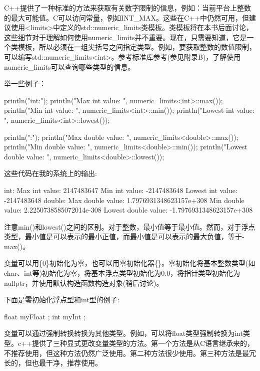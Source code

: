 C++提供了一种标准的方法来获取有关数字限制的信息，例如：当前平台上整数的最大可能值。C可以访问常量，例如INT\_MAX。这些在C++中仍然可用，但建议使用<limits>中定义的std::numeric\_limits类模板。类模板将在本书后面讨论，这些细节对于理解如何使用numeric\_limits并不重要。现在，只需要知道，它是一个类模板，所以必须在一组尖括号之间指定类型。例如，要获取整数的数值限制，可以编写std::numeric\_limits<int>。参考标准库参考(参见附录B)，了解使用numeric\_limits可以查询哪些类型的信息。

举一些例子：

\begin{cpp}
println("int:");
println("Max int value: {}", numeric_limits<int>::max());
println("Min int value: {}", numeric_limits<int>::min());
println("Lowest int value: {}", numeric_limits<int>::lowest());

println("\ndouble:");
println("Max double value: {}", numeric_limits<double>::max());
println("Min double value: {}", numeric_limits<double>::min());
println("Lowest double value: {}", numeric_limits<double>::lowest());
\end{cpp}

这些代码在我的系统上的输出:

\begin{shell}
int:
Max int value: 2147483647
Min int value: -2147483648
Lowest int value: -2147483648
double:
Max double value: 1.7976931348623157e+308
Min double value: 2.2250738585072014e-308
Lowest double value: -1.7976931348623157e+308
\end{shell}

注意min()和lowest()之间的区别。对于整数，最小值等于最小值。然而，对于浮点类型，最小值是可以表示的最小正值，而最小值是可以表示的最大负值，等于-max()。


变量可以用\{0\}初始化为零，也可以用零初始化器\{\}。零初始化将基本整数类型(如char、int等)初始化为零，将基本浮点类型初始化为0.0，将指针类型初始化为nullptr，并使用默认构造函数构造对象(稍后讨论)。

下面是零初始化浮点型和int型的例子:

\begin{cpp}
float myFloat {};
int myInt {};
\end{cpp}


变量可以通过强制转换转换为其他类型。例如，可以将float类型强制转换为int类型。c++提供了三种显式更改变量类型的方法。第一个方法是从C语言继承来的，不推荐使用，但这种方法仍然广泛使用。第二种方法很少使用。第三种方法是最冗长的，但也最干净，推荐使用。


